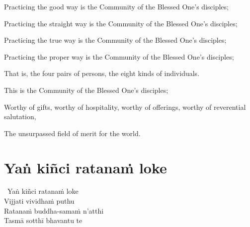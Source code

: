 \begin{english-verses}
  \begin{english-hang-firstline}
    Practicing the good way is the Community of the Blessed One's disciples;
  \end{english-hang-firstline}
  \begin{english-hangtogether-verses}
    Practicing the straight way is the Community of the Blessed One's disciples;
  \end{english-hangtogether-verses}
  \begin{english-hangtogether-verses}
    Practicing the true way is the Community of the Blessed One's disciples;
  \end{english-hangtogether-verses}
  \begin{english-hangtogether-verses}
    Practicing the proper way is the Community of the Blessed One's disciples;
  \end{english-hangtogether-verses}
  \begin{english-hangtogether-verses}
    That is, the four pairs of persons, the eight kinds of individuals.
  \end{english-hangtogether-verses}
  \begin{english-hangtogether-verses}
    This is the Community of the Blessed One's disciples;
  \end{english-hangtogether-verses}
  \begin{english-hangtogether-verses}
    Worthy of gifts, worthy of hospitality, worthy of offerings, worthy of reverential salutation,
  \end{english-hangtogether-verses}
  \begin{english-hangtogether-verses}
    The unsurpassed field of merit for the world.
  \end{english-hangtogether-verses}
\end{english-verses}

\suttaRef{[SN 11.3]}



\section{Yaṅ kiñci ratanaṁ loke}
\label{yan-kinci-ratanam'loke}

\begin{pali-hangtogether}
  \anglebracketleft\ \hspace{-0.5mm}Yaṅ kiñci ratanaṁ loke \hspace{-0.5mm}\anglebracketright\ \\
  Vijjati vividhaṁ puthu\\
  Ratanaṁ buddha-samaṁ n'atthi\\
  Tasmā sotthī bhavantu te
\end{pali-hangtogether}

